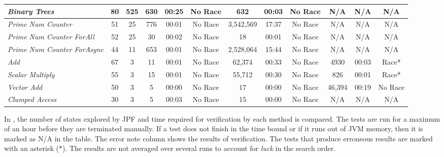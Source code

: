 \begin{table*}
{\begin{tabular}{|m{3.5cm}|c|c|c|c|c|c|c|c|c|c|c|}
\textit{Binary Trees }& 80 & 525 
& 630 & 00:25 & No Race
& 632 & 00:03 & No Race 
& N/A & N/A & N/A \\ \hline

\textit{Prime Num Counter} & 51 & 25
& 776 & 00:01 & No Race
& 3,542,569 & 17:37 & No Race 
& N/A & N/A & N/A \\ \hline

\textit{Prime Num  Counter ForAll}  & 52 & 25
& 30 & 00:02 & No Race
& 18 & 00:01 & No Race
& N/A & N/A & N/A \\ \hline

\textit{Prime Num Counter ForAsync}  & 44 & 11 
& 653 & 00:01 & No Race
& 2,528,064 & 15:44 & No Race 
& N/A & N/A & N/A \\ \hline

\textit{Add}  & 67 & 3 
& 11 & 00:01 & No Race 
& 62,374 & 00:33 & No Race
& 4930 & 00:03 & Race* \\ \hline

\textit{Scalar Multiply}  & 55 & 3 
& 15 & 00:01 & No Race
& 55,712 & 00:30 & No Race 
& 826 & 00:01 & Race* \\ \hline

\textit{Vector Add} & 50 & 3 
& 5 & 00:00 & No Race
& 17 & 00:00 & No Race 
& 46,394 & 00:19 & No Race \\ \hline

\textit{Clumped Access}  & 30 & 3 
& 5 & 00:03 & No Race
& 15 & 00:00 & No Race 
& N/A & N/A & N/A \\ \hline

\end{tabular}}
\end{table*}

In , the number of states explored by JPF and time required for verification by each method is compared. The tests are run for a maximum of an hour before they are terminated manually. If a test does not finish in the time bound or if it runs out of JVM memory, then it is marked as N/A in the table. The error note column shows the results of verification. The tests that produce erroneous results are marked with an asterisk ($\ast$). The results are not averaged over several runs to account for \emph{luck} in the search order. 

